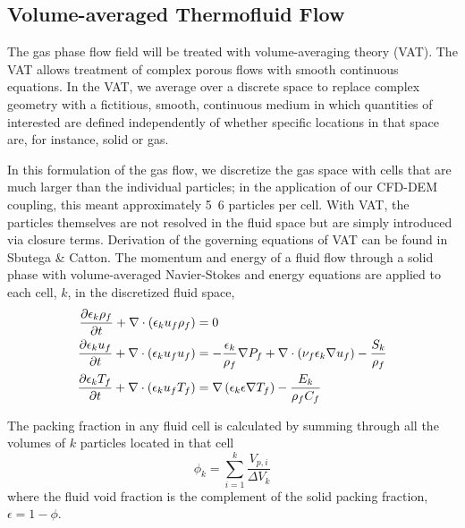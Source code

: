 \subsection{Volume-averaged Thermofluid Flow}

The gas phase flow field will be treated with volume-averaging theory (VAT).\cite{Sbutega2013,whitaker1999method,Tsuji1992} The VAT allows treatment of complex porous flows with smooth continuous equations. In the VAT, we average over a discrete space to replace complex geometry with a fictitious, smooth, continuous medium in which quantities of interested are defined independently of whether specific locations in that space are, for instance, solid or gas.

In this formulation of the gas flow, we discretize the gas space with cells that are much larger than the individual particles; in the application of our CFD-DEM coupling, this meant approximately 5~6 particles per cell. With VAT, the particles themselves are not resolved in the fluid space but are simply introduced via closure terms.\cite{Sbutega2013,Horvat2006} Derivation of the governing equations of VAT can be found in Sbutega \& Catton\cite{Sbutega2013}. The momentum and energy of a fluid flow through a solid phase with volume-averaged Navier-Stokes and energy equations are applied to each cell, $k$, in the discretized fluid space,
\begin{subequations}
\begin{align}
\pder[\epsilon_k \rho_f]{t} + \nabla\cdot(\epsilon_k u_f \rho_f) &= 0\\
\pder[\epsilon_k u_f]{t} + \nabla\cdot(\epsilon_k u_f u_f) &= -\frac{\epsilon_k}{\rho_f}\nabla P_f + \nabla\cdot\left(\nu_f\epsilon_k\nabla u_f\right) - \frac{S_k}{\rho_f}\\
\pder[\epsilon_k T_f]{t} + \nabla\cdot(\epsilon_k u_f T_f) &= \nabla\left(\epsilon_k\epsilon\nabla T_f\right)-\frac{E_k}{\rho_fC_f}
\end{align}
\end{subequations}

The packing fraction in any fluid cell is calculated by summing through all the volumes of $k$ particles located in that cell
\begin{equation}
	\phi_k = \sum_{i=1}^k \frac{V_{p,i}}{\Delta V_k}
\end{equation}
where the fluid void fraction is the complement of the solid packing fraction, $\epsilon = 1 - \phi$. 

